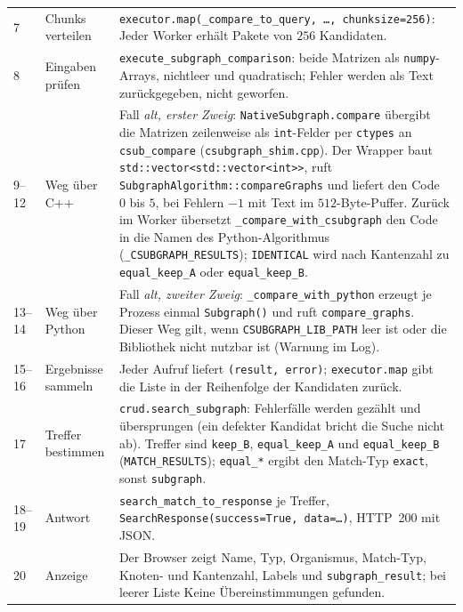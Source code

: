{\begin{longtable}{@{}L{0.9cm}L{4.6cm}L{9.3cm}@{}}
	7 & Chunks verteilen & \texttt{executor.map(\_compare\_to\_query, \ldots, chunksize=256)}: Jeder Worker erhält Pakete von $256$ Kandidaten. \\[0.3em]
	8 & Eingaben prüfen & \texttt{execute\_subgraph\_comparison}: beide Matrizen als \texttt{numpy}-Arrays, nichtleer und quadratisch; Fehler werden als Text zurückgegeben, nicht geworfen. \\[0.3em]
	9--12 & Weg über C++ & Fall \emph{alt, erster Zweig}: \texttt{NativeSubgraph.compare} übergibt die Matrizen zeilenweise als \texttt{int}-Felder per \texttt{ctypes} an \texttt{csub\_compare} (\texttt{csubgraph\_shim.cpp}). Der Wrapper baut \texttt{std::vector<std::vector<int>>}, ruft \texttt{SubgraphAlgorithm::compareGraphs} und liefert den Code $0$ bis $5$, bei Fehlern $-1$ mit Text im $512$-Byte-Puffer. Zurück im Worker übersetzt \texttt{\_compare\_with\_csubgraph} den Code in die Namen des Python-Algorithmus (\texttt{\_CSUBGRAPH\_RESULTS}); \texttt{IDENTICAL} wird nach Kantenzahl zu \texttt{equal\_keep\_A} oder \texttt{equal\_keep\_B}. \\[0.3em]
	13--14 & Weg über Python & Fall \emph{alt, zweiter Zweig}: \texttt{\_compare\_with\_python} erzeugt je Prozess einmal \texttt{Subgraph()} und ruft \texttt{compare\_graphs}. Dieser Weg gilt, wenn \texttt{CSUBGRAPH\_LIB\_PATH} leer ist oder die Bibliothek nicht nutzbar ist (Warnung im Log). \\[0.3em]
	15--16 & Ergebnisse sammeln & Jeder Aufruf liefert \texttt{(result, error)}; \texttt{executor.map} gibt die Liste in der Reihenfolge der Kandidaten zurück. \\[0.3em]
	17 & Treffer bestimmen & \texttt{crud.search\_subgraph}: Fehlerfälle werden gezählt und übersprungen (ein defekter Kandidat bricht die Suche nicht ab). Treffer sind \texttt{keep\_B}, \texttt{equal\_keep\_A} und \texttt{equal\_keep\_B} (\texttt{MATCH\_RESULTS}); \texttt{equal\_*} ergibt den Match-Typ \texttt{exact}, sonst \texttt{subgraph}. \\[0.3em]
	18--19 & Antwort & \texttt{search\_match\_to\_response} je Treffer, \texttt{SearchResponse(success=True, data=\ldots)}, HTTP~200 mit JSON. \\[0.3em]
	20 & Anzeige & Der Browser zeigt Name, Typ, Organismus, Match-Typ, Knoten- und Kantenzahl, Labels und \texttt{subgraph\_result}; bei leerer Liste \glqq Keine Übereinstimmungen gefunden\grqq. \\
	\bottomrule
\end{longtable}
}

